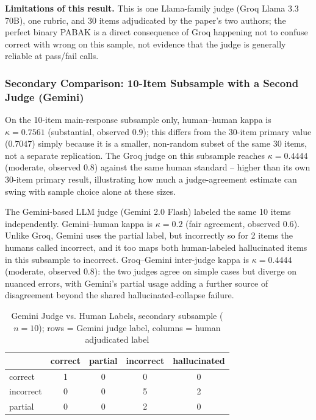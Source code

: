\documentclass[conference]{IEEEtran}
\begin{document}
\textbf{Limitations of this result.} This is one Llama-family judge (Groq Llama 3.3 70B), one rubric, and 30 items adjudicated by the paper's two authors; the perfect binary PABAK is a direct consequence of Groq happening not to confuse correct with wrong on this sample, not evidence that the judge is generally reliable at pass/fail calls.

\subsubsection{Secondary Comparison: 10-Item Subsample with a Second Judge (Gemini)}
On the 10-item main-response subsample only, human--human kappa is $\kappa=0.7561$ (substantial, observed $0.9$); this differs from the 30-item primary value ($0.7047$) simply because it is a smaller, non-random subset of the same 30 items, not a separate replication. The Groq judge on this subsample reaches $\kappa=0.4444$ (moderate, observed $0.8$) against the same human standard -- higher than its own 30-item primary result, illustrating how much a judge-agreement estimate can swing with sample choice alone at these sizes.

The Gemini-based LLM judge (Gemini 2.0 Flash) labeled the same 10 items independently. Gemini--human kappa is $\kappa=0.2$ (fair agreement, observed $0.6$). Unlike Groq, Gemini uses the partial label, but incorrectly so for 2 items the humans called incorrect, and it too maps both human-labeled hallucinated items in this subsample to incorrect. Groq--Gemini inter-judge kappa is $\kappa=0.4444$ (moderate, observed $0.8$): the two judges agree on simple cases but diverge on nuanced errors, with Gemini's partial usage adding a further source of disagreement beyond the shared hallucinated-collapse failure.

\begin{table}[h]
\caption{Gemini Judge vs. Human Labels, secondary subsample ($n=10$); rows = Gemini judge label, columns = human adjudicated label}
\label{tab:confusion-gemini}
\centering
\begin{tabular}{lcccc}
\hline
 & correct & partial & incorrect & hallucinated \\
\hline
correct & 1 & 0 & 0 & 0 \\
incorrect & 0 & 0 & 5 & 2 \\
partial & 0 & 0 & 2 & 0 \\
\hline
\end{tabular}
\end{table}
\end{document}

